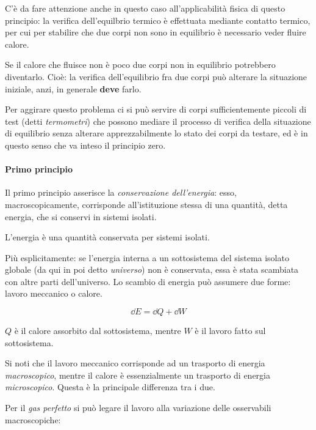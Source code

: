 \begin{note}
	C'è da fare attenzione anche in questo caso all'applicabilità fisica di questo principio: la verifica dell'equilbrio termico è effettuata mediante contatto termico, per cui per stabilire che due corpi non sono in equilibrio è necessario veder fluire calore.
	
	Se il calore che fluisce non è poco due corpi non in equilibrio potrebbero diventarlo. Cioè: la verifica dell'equilibrio fra due corpi può alterare la situazione iniziale, anzi, in generale \textbf{deve} farlo.
	
	Per aggirare questo problema ci si può servire di corpi sufficientemente piccoli di test (detti \textit{termometri}) che possono mediare il processo di verifica della situazione di equilibrio senza alterare apprezzabilmente lo stato dei corpi da testare, ed è in questo senso che va inteso il principio zero.
\end{note}

\paragraph{Primo principio} Il primo principio asserisce la \textit{conservazione dell'energia}: esso, macroscopicamente, corrisponde all'istituzione stessa di una quantità, detta energia, che si conservi in sistemi isolati.

\begin{defn}
	L'energia è una quantità conservata per sistemi isolati.
	
	Più esplicitamente: se l'energia interna a un sottosistema del sistema isolato globale (da qui in poi detto \textit{universo}) non è conservata, essa è stata scambiata con altre parti dell'universo. Lo scambio di energia può assumere due forme: lavoro meccanico o calore.
	
	\begin{equation*}
		\dd E = \dd Q + \dd W
	\end{equation*}
	
	$Q$ è il calore assorbito dal sottosistema, mentre $W$ è il lavoro fatto sul sottosistema.
\end{defn}

\noindent Si noti che il lavoro meccanico corrisponde ad un trasporto di energia \textit{macroscopico}, mentre il calore è essenzialmente un trasporto di energia \textit{microscopico}. Questa è la principale differenza tra i due.

Per il \textit{gas perfetto} si può legare il lavoro alla variazione delle osservabili macroscopiche:

